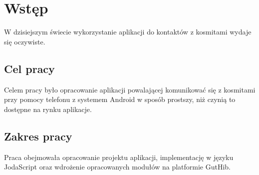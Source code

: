 
\chapter{Wstęp}

W dzisiejszym świecie wykorzystanie aplikacji do kontaktów z kosmitami wydaje się oczywiste. \lipsum[6]

\section{Cel pracy}

Celem pracy było opracowanie aplikacji powalającej komunikować się z kosmitami przy pomocy telefonu z systemem Android w sposób prostszy, niż czynią to dostępne na rynku aplikacje. 

\section{Zakres pracy}

Praca obejmowała opracowanie projektu aplikacji, implementację w języku JodaScript oraz wdrożenie opracowanych modułów na platformie GutHib.
